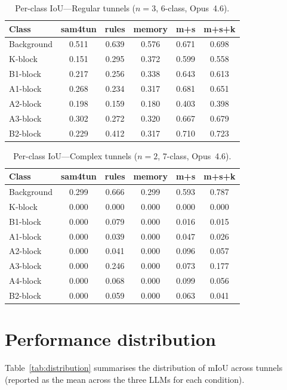 \begin{table}[ht]
\caption{Per-class IoU---Regular tunnels ($n=3$, 6-class, Opus~4.6).}\label{tab:perclass-regular}
\begin{tabular*}{\tblwidth}{@{} l c c c c c @{}}
\toprule
Class & sam4tun & rules & memory & m+s & m+s+k \\
\midrule
Background & 0.511 & 0.639 & 0.576 & 0.671 & 0.698 \\
K-block & 0.151 & 0.295 & 0.372 & 0.599 & 0.558 \\
B1-block & 0.217 & 0.256 & 0.338 & 0.643 & 0.613 \\
A1-block & 0.268 & 0.234 & 0.317 & 0.681 & 0.651 \\
A2-block & 0.198 & 0.159 & 0.180 & 0.403 & 0.398 \\
A3-block & 0.302 & 0.272 & 0.320 & 0.667 & 0.679 \\
B2-block & 0.229 & 0.412 & 0.317 & 0.710 & 0.723 \\
\bottomrule
\end{tabular*}
\end{table}

\begin{table}[ht]
\caption{Per-class IoU---Complex tunnels ($n=2$, 7-class, Opus~4.6).}\label{tab:perclass-complex}
\begin{tabular*}{\tblwidth}{@{} l c c c c c @{}}
\toprule
Class & sam4tun & rules & memory & m+s & m+s+k \\
\midrule
Background & 0.299 & 0.666 & 0.299 & 0.593 & 0.787 \\
K-block & 0.000 & 0.000 & 0.000 & 0.000 & 0.000 \\
B1-block & 0.000 & 0.079 & 0.000 & 0.016 & 0.015 \\
A1-block & 0.000 & 0.039 & 0.000 & 0.047 & 0.026 \\
A2-block & 0.000 & 0.041 & 0.000 & 0.096 & 0.057 \\
A3-block & 0.000 & 0.246 & 0.000 & 0.073 & 0.177 \\
A4-block & 0.000 & 0.068 & 0.000 & 0.099 & 0.056 \\
B2-block & 0.000 & 0.059 & 0.000 & 0.063 & 0.041 \\
\bottomrule
\end{tabular*}
\end{table}

\section{Performance distribution}\label{app:distribution}
Table~\ref{tab:distribution} summarises the distribution of mIoU across tunnels (reported as the mean across the three LLMs for each condition).

